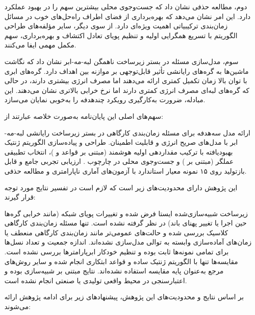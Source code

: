 دوم، مطالعه حذفی نشان داد که جست‌وجوی محلی بیشترین سهم
را در بهبود عملکرد دارد.
این امر نشان می‌دهد که بهره‌برداری
از فضای اطراف راه‌حل‌های خوب
در مسائل زمان‌بندی ترکیبیاتی اهمیت ویژه‌ای دارد.
از سوی دیگر، سایر مؤلفه‌های طراحی الگوریتم
با تسریع همگرایی اولیه و تنظیم پویای تعادل اکتشاف و بهره‌برداری،
سهم مکمل مهمی ایفا می‌کنند.

سوم، مدل‌سازی مسئله در بستر زیرساخت ناهمگن لبه-مه-ابر نشان داد
که نگاشت ماشین‌ها به گره‌های رایانشی
تأثیر قابل‌توجهی بر موازنه بین اهداف دارد.
گره‌های ابری با توان بالا زمان تکمیل کمتری ارائه می‌دهند
اما مصرف انرژی بیشتری دارند،
در حالی که گره‌های لبه‌ای مصرف انرژی کمتری دارند
اما نرخ خرابی بالاتری نشان می‌دهند.
این مبادله، ضرورت به‌کارگیری رویکرد چندهدفه
را به‌خوبی نمایان می‌سازد.



سهم‌های اصلی این پایان‌نامه به‌صورت خلاصه عبارتند از:

ارائه مدل سه‌هدفه برای مسئله زمان‌بندی کارگاهی
در بستر زیرساخت رایانشی لبه-مه-ابر
با مدل‌های صریح انرژی و قابلیت اطمینان.
طراحی و پیاده‌سازی الگوریتم ژنتیک بهبودیافته
با ترکیب مقداردهی اولیه هوشمند (مبتنی بر قواعد  و )،
انتخاب تطبیقی عملگر (مبتنی بر )
و جست‌وجوی محلی در چارچوب .
ارزیابی تجربی جامع و قابل بازتولید
روی ۱۵ نمونه معیار استاندارد
با آزمون‌های آماری ناپارامتری و مطالعه حذفی.



این پژوهش دارای محدودیت‌های زیر است
که لازم است در تفسیر نتایج مورد توجه قرار گیرند:

زیرساخت شبیه‌سازی‌شده ایستا فرض شده
و تغییرات پویای شبکه (مانند خرابی گره‌ها حین اجرا
یا تغییر پهنای باند) در نظر گرفته نشده است.
تنها مسئله زمان‌بندی کارگاهی کلاسیک بررسی شده
و حالت‌های عمومی‌تر مانند
زمان‌بندی کارگاهی منعطف
یا زمان‌های آماده‌سازی وابسته به توالی
مدل‌سازی نشده‌اند.
اندازه جمعیت و تعداد نسل‌ها برای تمامی نمونه‌ها ثابت بوده
و تنظیم خودکار ابرپارامترها بررسی نشده است.
مقایسه‌ها تنها با الگوریتم ژنتیک ساده و قواعد ابتکاری انجام شده
و سایر روش‌های مرجع
به‌عنوان پایه مقایسه استفاده نشده‌اند.
نتایج مبتنی بر شبیه‌سازی بوده
و اعتبارسنجی در محیط واقعی تولیدی یا صنعتی انجام نشده است.



بر اساس نتایج و محدودیت‌های این پژوهش،
پیشنهادهای زیر برای ادامه پژوهش ارائه می‌شوند:


